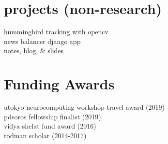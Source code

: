 \begin{minipage}[t]{0.32\textwidth}
\sectionspace %

\section{projects (non-research)}
hummingbird tracking with opencv \href{https://csinva.github.io/assets/singh_18_hummingbird_tracking.pdf}{\faChain} \href{https://github.com/csinva/hummingbird_tracking}{\faCode}\\
news balancer django app \href{https://github.com/csinva/news-balancer}{\faCode}\\
notes, blog, \& slides \href{https://csinva.github.io/#notes_main}{\faChain}
\sectionspace %


\section{Funding Awards}
utokyo neurocomputing workshop travel award (2019)\\
pdsoros fellowship finalist (2019)\\
vidya shelat fund award (2016)\\
rodman scholar (2014-2017)\\
\sectionspace %


\end{minipage} %
\hfill
